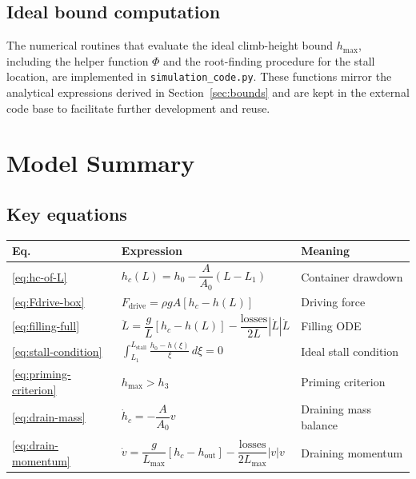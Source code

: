 \documentclass[11pt]{article}
\theoremstyle{definition}
\begin{document}
\subsection{Ideal bound computation}

The numerical routines that evaluate the ideal climb-height bound $h_{\max}$, including
  the helper function $\Phi$ and the root-finding procedure for the stall location, are
  implemented in \texttt{simulation\_code.py}. These functions mirror the analytical
expressions derived in Section~\ref{sec:bounds} and are kept in the external code
  base to facilitate further development and reuse.

\section{Model Summary}
\label{sec:summary}

\subsection{Key equations}

\renewcommand{\arraystretch}{1.4}
\begin{center}
\begin{tabular}{lp{6cm}l}
\toprule
Eq. & Expression & Meaning \\
\midrule
\eqref{eq:hc-of-L} & $h_c(L) = h_0 - \dfrac{A}{A_0}(L - L_1)$ & Container drawdown \\[0.8em]
\eqref{eq:Fdrive-box} & $F_{\text{drive}} = \rho g A[h_c - h(L)]$ & Driving force \\[0.8em]
\eqref{eq:filling-full} & $\ddot{L} = \dfrac{g}{L}[h_c - h(L)] - \dfrac{\text{losses}}{2L}|\dot{L}|\dot{L}$ 
                        & Filling ODE \\[0.8em]
\eqref{eq:stall-condition} & $\displaystyle\int_{L_1}^{L_{\text{stall}}} \frac{h_0 - h(\xi)}{\xi}\,d\xi = 0$ 
                           & Ideal stall condition \\[1em]
\eqref{eq:priming-criterion} & $h_{\max} > h_3$ & Priming criterion \\[0.4em]
\eqref{eq:drain-mass} & $\dot{h}_c = -\dfrac{A}{A_0}v$ & Draining mass balance \\[0.8em]
\eqref{eq:drain-momentum} & $\dot{v} = \dfrac{g}{L_{\max}}[h_c - h_{\text{out}}] - \dfrac{\text{losses}}{2L_{\max}}|v|v$ 
                          & Draining momentum \\
\bottomrule
\end{tabular}
\end{center}
\end{document}

